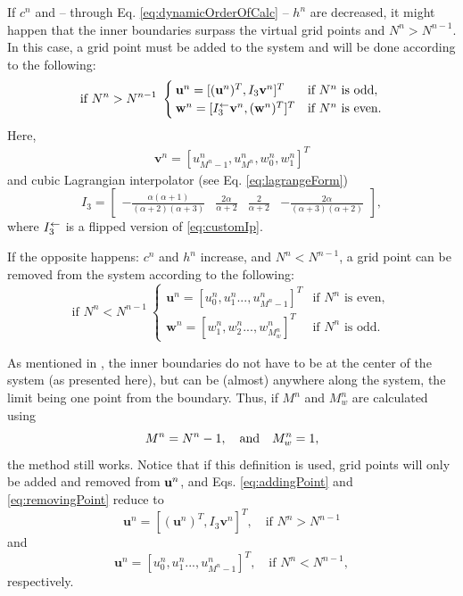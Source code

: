 If $c^n$ and -- through Eq. \eqref{eq:dynamicOrderOfCalc} -- $h^n$ are decreased, it might happen that the inner boundaries surpass the virtual grid points and $N^n > N^{n-1}$. In this case, a grid point must be added to the system and will be done according to the following:
\begin{equation}\label{eq:addingPoint}
    \text{if } N^n>N^{n-1}\ \begin{cases}\mathbf{u}^n = [(\mathbf{u}^n)^T, I_3\mathbf{v}^n]^T & \text{if $N^n $ is odd},\\
    \mathbf{w}^n = [I_3^\leftarrow\mathbf{v}^n, (\mathbf{w}^n)^T]^T & \text{if $ N^n$ is even}.
    \end{cases}
\end{equation}
Here, 
\begin{align*}
\mathbf{v}^n = [u_{M^n-1}^n, u_{M^n}^n, w_0^n, w_1^n]^T%
\end{align*}
and cubic Lagrangian interpolator (see Eq. \eqref{eq:lagrangeForm})
\begin{equation}\label{eq:customIp}
I_3 = \begin{bmatrix} -\frac{\alpha(\alpha+1)}{(\alpha+2)(\alpha+3)} &\frac{2\alpha}{\alpha+2} &\frac{2}{\alpha+2} 
&-\frac{2\alpha}{(\alpha+3)(\alpha+2)}
\end{bmatrix},
\end{equation}
where $I_3^\leftarrow$ is a flipped version of \eqref{eq:customIp}.

If the opposite happens: $c^n$ and $h^n$ increase, and $N^n<N^{n-1}$, a grid point can be removed from the system according to the following:
\begin{equation}\label{eq:removingPoint}
\text{if } N^n<N^{n-1}\ \begin{cases}
    \mathbf{u}^n = [u_0^n, u_1^n ..., u_{M^n-1}^n]^T & \text{if $N^n$ is even}, \\
        \mathbf{w}^n = [w_1^n, w_2^n ..., w_{M_w^n}^n]^T & \text{if $N^n$ is odd}.
    \end{cases}
\end{equation}

As mentioned in \citeP[G], the inner boundaries do not have to be at the center of the system (as presented here), but can be (almost) anywhere along the system, the limit being one point from the boundary. Thus, if $M^n$ and $M_w^n$ are calculated using 
\begin{equation} \label{eq:alternativeM}
    M^n = N^n - 1,\quad \text{and} \quad  M_w^n= 1,
\end{equation}
the method still works. Notice that if this definition is used, grid points will only be added and removed from $\mathbf{u}^n$, and Eqs. \eqref{eq:addingPoint} and \eqref{eq:removingPoint} reduce to
\begin{equation}\label{eq:alternativeAddingPoint}
    \mathbf{u}^n = [(\mathbf{u}^n)^T, I_3\mathbf{v}^n]^T,\quad \text{if } N^n>N^{n-1}
\end{equation}
and 
\begin{equation}
    \mathbf{u}^n = [u_0^n, u_1^n ..., u_{M^n-1}^n]^T,\quad \text{if } N^n<N^{n-1},
\end{equation}
respectively.
